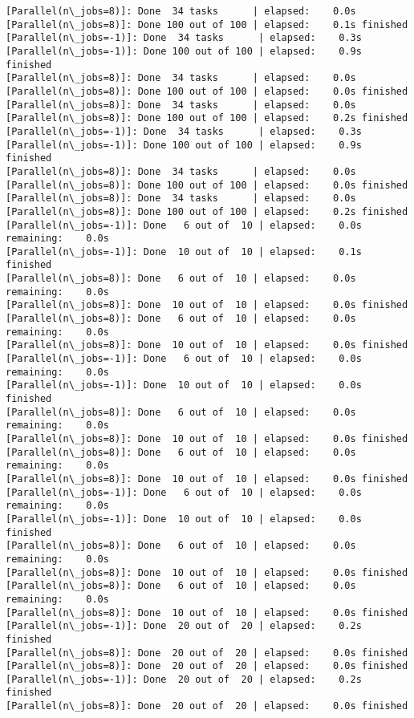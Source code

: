 \documentclass[11pt]{article}
\begin{document}
\begin{Verbatim}[commandchars=\\\{\}]
[Parallel(n\_jobs=8)]: Done  34 tasks      | elapsed:    0.0s
[Parallel(n\_jobs=8)]: Done 100 out of 100 | elapsed:    0.1s finished
[Parallel(n\_jobs=-1)]: Done  34 tasks      | elapsed:    0.3s
[Parallel(n\_jobs=-1)]: Done 100 out of 100 | elapsed:    0.9s finished
[Parallel(n\_jobs=8)]: Done  34 tasks      | elapsed:    0.0s
[Parallel(n\_jobs=8)]: Done 100 out of 100 | elapsed:    0.0s finished
[Parallel(n\_jobs=8)]: Done  34 tasks      | elapsed:    0.0s
[Parallel(n\_jobs=8)]: Done 100 out of 100 | elapsed:    0.2s finished
[Parallel(n\_jobs=-1)]: Done  34 tasks      | elapsed:    0.3s
[Parallel(n\_jobs=-1)]: Done 100 out of 100 | elapsed:    0.9s finished
[Parallel(n\_jobs=8)]: Done  34 tasks      | elapsed:    0.0s
[Parallel(n\_jobs=8)]: Done 100 out of 100 | elapsed:    0.0s finished
[Parallel(n\_jobs=8)]: Done  34 tasks      | elapsed:    0.0s
[Parallel(n\_jobs=8)]: Done 100 out of 100 | elapsed:    0.2s finished
[Parallel(n\_jobs=-1)]: Done   6 out of  10 | elapsed:    0.0s remaining:    0.0s
[Parallel(n\_jobs=-1)]: Done  10 out of  10 | elapsed:    0.1s finished
[Parallel(n\_jobs=8)]: Done   6 out of  10 | elapsed:    0.0s remaining:    0.0s
[Parallel(n\_jobs=8)]: Done  10 out of  10 | elapsed:    0.0s finished
[Parallel(n\_jobs=8)]: Done   6 out of  10 | elapsed:    0.0s remaining:    0.0s
[Parallel(n\_jobs=8)]: Done  10 out of  10 | elapsed:    0.0s finished
[Parallel(n\_jobs=-1)]: Done   6 out of  10 | elapsed:    0.0s remaining:    0.0s
[Parallel(n\_jobs=-1)]: Done  10 out of  10 | elapsed:    0.0s finished
[Parallel(n\_jobs=8)]: Done   6 out of  10 | elapsed:    0.0s remaining:    0.0s
[Parallel(n\_jobs=8)]: Done  10 out of  10 | elapsed:    0.0s finished
[Parallel(n\_jobs=8)]: Done   6 out of  10 | elapsed:    0.0s remaining:    0.0s
[Parallel(n\_jobs=8)]: Done  10 out of  10 | elapsed:    0.0s finished
[Parallel(n\_jobs=-1)]: Done   6 out of  10 | elapsed:    0.0s remaining:    0.0s
[Parallel(n\_jobs=-1)]: Done  10 out of  10 | elapsed:    0.0s finished
[Parallel(n\_jobs=8)]: Done   6 out of  10 | elapsed:    0.0s remaining:    0.0s
[Parallel(n\_jobs=8)]: Done  10 out of  10 | elapsed:    0.0s finished
[Parallel(n\_jobs=8)]: Done   6 out of  10 | elapsed:    0.0s remaining:    0.0s
[Parallel(n\_jobs=8)]: Done  10 out of  10 | elapsed:    0.0s finished
[Parallel(n\_jobs=-1)]: Done  20 out of  20 | elapsed:    0.2s finished
[Parallel(n\_jobs=8)]: Done  20 out of  20 | elapsed:    0.0s finished
[Parallel(n\_jobs=8)]: Done  20 out of  20 | elapsed:    0.0s finished
[Parallel(n\_jobs=-1)]: Done  20 out of  20 | elapsed:    0.2s finished
[Parallel(n\_jobs=8)]: Done  20 out of  20 | elapsed:    0.0s finished

\end{Verbatim}
\end{document}
